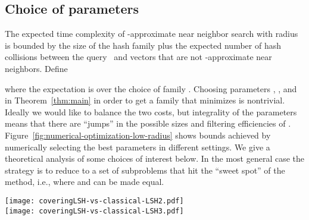 \documentclass[prodmode,acmtalg]{acmsmall}
\begin{document}
\subsection{Choice of parameters}

The expected time complexity of -approximate near neighbor search with radius~ is bounded by the size  of the hash family plus the expected number  of hash collisions between the query~ and vectors  that are not -approximate near neighbors. Define

where the expectation is over the choice of family .
Choosing parameters , , and  in Theorem~\ref{thm:main} in order to get a family  that minimizes  is nontrivial.
Ideally we would like to balance the two costs, but integrality of the parameters means that there are ``jumps'' in the possible sizes and filtering efficiencies of
. Figure~\ref{fig:numerical-optimization-low-radius} shows bounds achieved by numerically selecting the best parameters in different settings. We give a theoretical analysis of some choices of interest below. In the most general case the strategy is to reduce to a set of subproblems that hit the ``sweet spot'' of the method, i.e., where  and  can be made equal. 

\begin{figure*}[t]
	\begin{center}
	\texttt{[image: coveringLSH-vs-classical-LSH2.pdf]}\\
	\bigskip
	\texttt{[image: coveringLSH-vs-classical-LSH3.pdf]}
	\caption{Expected number of memory accesses for different similarity search methods for finding a vector within Hamming distance~ of a query vector~. The plots are for  and , respectively, and are for a worst-case data set where all points have distance~ from~, i.e., there exists no -approximate near neighbor for an approximation factor . The bound for exhaustive search in a Hamming ball of radius  optimistically assumes that the number of dimensions is~, which is smallest possible for a data set of size  (for  this number is so large that it is not even shown).
	Two bounds are shown for the classical LSH method of Indyk and Motwani: A small fixed false negative probability of 1\%, and a false negative probability of .
	The latter is what is needed to ensure no false negatives in a sequence of  searches.
	The bound for CoveringLSH in the case  uses a single partition (), while for  multiple partitions are used.}\label{fig:numerical-optimization-low-radius}
	\end{center}
\end{figure*}
\end{document}
